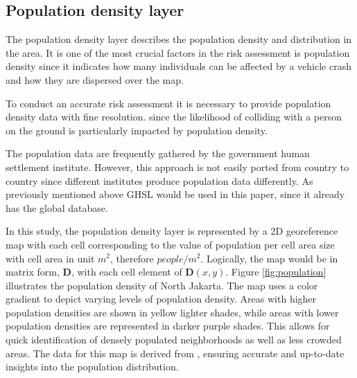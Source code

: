 \documentclass[12pt]{report}
\begin{document}
        \subsection{Population density layer}
            The population density layer describes the population density and distribution in the area. It is one of the
            most crucial factors in the risk assessment is population density since it indicates how many individuals
            can be affected by a vehicle crash and how they are dispersed over the map.

            To conduct an accurate risk assessment it is necessary to provide population density data with fine
            resolution. since the likelihood of colliding with a person on the ground is particularly impacted by
            population density.

            The population data are frequently gathered by the government human settlement institute. However, this
            approach is not easily ported from country to country since different institutes produce population data
            differently. As previously mentioned above GHSL would be used in this paper, since it already has the global
            database.

            In this study, the population density layer is represented by a 2D georeference map with each cell
            corresponding to the value of population per cell area size with cell area in unit \(m^2\), therefore
            \(people/m^2\). Logically, the map would be in matrix form, \textbf{D}, with each cell element of
            \(\mathbf{D}(x, y)\). Figure \ref{fig:population} illustrates the population density of North Jakarta. The
            map uses a color gradient to depict varying levels of population density. Areas with higher population
            densities are shown in yellow lighter shades, while areas with lower population densities are represented in
            darker purple shades. This allows for quick identification of densely populated neighborhoods as well as
            less crowded areas. The data for this map is derived from \cite{commission_ghsl_2023}, ensuring accurate and
            up-to-date insights into the population distribution. 
            
\end{document}
